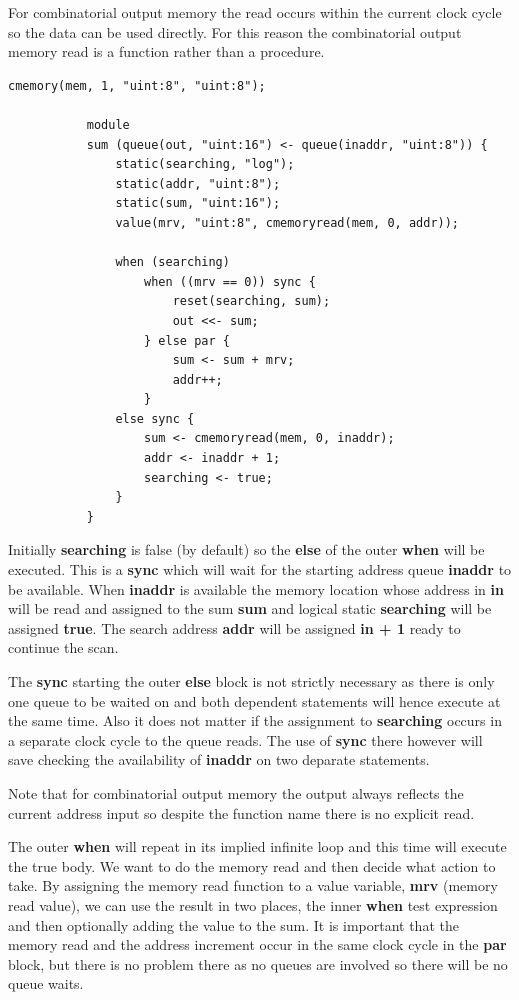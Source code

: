         For combinatorial output memory the read occurs within the current
        clock cycle so the data can be used directly. For this reason the
        combinatorial output memory read is a function rather than a
        procedure.
        \begin{lstlisting}[gobble=8, language=threepl]
           cmemory(mem, 1, "uint:8", "uint:8");

           module
           sum (queue(out, "uint:16") <- queue(inaddr, "uint:8")) {
               static(searching, "log");
               static(addr, "uint:8");
               static(sum, "uint:16");
               value(mrv, "uint:8", cmemoryread(mem, 0, addr));

               when (searching)
                   when ((mrv == 0)) sync {
                       reset(searching, sum);
                       out <<- sum;
                   } else par {
                       sum <- sum + mrv;
                       addr++;
                   }
               else sync {
                   sum <- cmemoryread(mem, 0, inaddr);
                   addr <- inaddr + 1;
                   searching <- true;
               }
           }
        \end{lstlisting}
        Initially {\bf searching} is false (by default) so the {\bf else} of the
        outer {\bf when} will be executed. This is a {\bf sync} which will wait
        for the starting address queue {\bf inaddr} to be available. When {\bf
        inaddr} is available the memory location whose address in {\bf in} will
        be read and assigned to the sum {\bf sum} and logical static {\bf
        searching} will be assigned {\bf true}. The search address {\bf addr}
        will be assigned {\bf in + 1} ready to continue the scan.
        
        The {\bf sync} starting the outer {\bf else} block is not strictly
        necessary as there is only one queue to be waited on and both dependent
        statements will hence execute at the same time. Also it does not matter
        if the assignment to {\bf searching} occurs in a separate clock cycle to
        the queue reads. The use of {\bf sync} there however will save checking
        the availability of {\bf inaddr} on two deparate statements.
        
        Note that for combinatorial output memory the output always reflects the
        current address input so despite the function name there is no explicit
        read.

        The outer {\bf when} will repeat in its implied infinite loop and this
        time will execute the true body. We want to do the memory read and then
        decide what action to take. By assigning the memory read function to a
        value variable, {\bf mrv} (memory read value), we can use the result in
        two places, the inner {\bf when} test expression and then optionally
        adding the value to the sum. It is important that the memory read and
        the address increment occur in the same clock cycle in the {\bf par}
        block, but there is no problem there as no queues are involved so there
        will be no queue waits.
        
